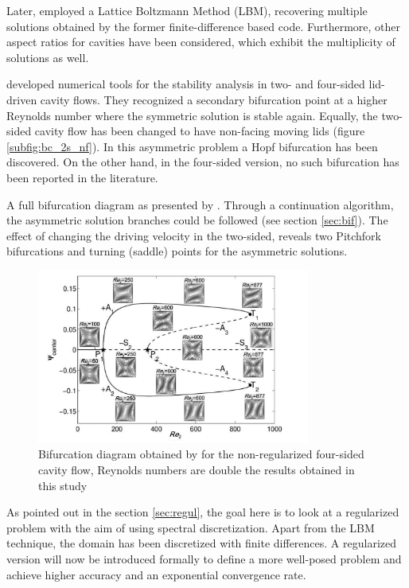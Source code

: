 Later, \cite{perumal2011} employed a Lattice Boltzmann Method (LBM), recovering
multiple solutions obtained by the former finite-difference based code.
Furthermore, other aspect ratios for cavities have been considered, which
exhibit the multiplicity of solutions as well. 

\cite{cadou2012} developed numerical tools for the stability analysis in two-
and four-sided lid-driven cavity flows. They recognized a secondary bifurcation
point at a higher Reynolds number where the symmetric solution is stable again.
Equally, the two-sided cavity flow has been changed to have non-facing moving
lids (figure \ref{subfig:bc_2s_nf}). In this asymmetric problem a Hopf
bifurcation has been discovered. On the other hand, in the four-sided version,
no such bifurcation has been reported in the literature.

A full bifurcation diagram as presented by \cite{chen2013}. Through a
continuation algorithm, the asymmetric solution branches could be followed (see
section \ref{sec:bif}). The effect of changing the driving
velocity in the two-sided, reveals two Pitchfork bifurcations and turning
(saddle) points for the asymmetric solutions. 

\begin{figure}[h]
  \begin{center}
  \includegraphics[width=0.8\textwidth]{figs/fig2_chen2013.png}
  \end{center}
  \label{fig:bif_diag_ref}
  \caption{Bifurcation diagram obtained by \cite{chen2013} for the
    non-regularized four-sided cavity flow, Reynolds numbers are 
    double the results obtained in this study} 
\end{figure}

As pointed out in the section \ref{sec:regul}, the goal here is to look at a
regularized problem with the aim of using spectral discretization. Apart from
the LBM technique, the domain has been discretized with finite differences. A
regularized version will now be introduced formally to define a more well-posed
problem and achieve higher accuracy and an exponential convergence rate.

